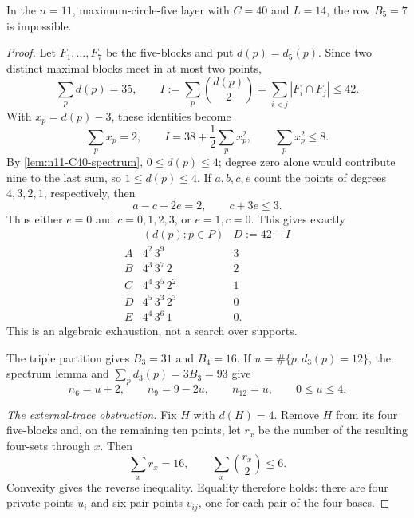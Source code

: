 \begin{lemma}\label{lem:n11-seven-five}
In the \(n=11\), maximum-circle-five layer with \(C=40\) and \(L=14\),
the row \(B_5=7\) is impossible.
\end{lemma}

\begin{proof}
Let \(F_1,\ldots,F_7\) be the five-blocks and put \(d(p)=d_5(p)\).  Since
two distinct maximal blocks meet in at most two points,
\[
 \sum_p d(p)=35,\qquad
 I:=\sum_p\binom{d(p)}2
   =\sum_{i<j}|F_i\cap F_j|\le42.
\]
With \(x_p=d(p)-3\), these identities become
\begin{equation}\label{eq:seven5-moment}
 \sum_p x_p=2,\qquad I=38+\frac12\sum_p x_p^2,
 \qquad \sum_p x_p^2\le8.
\end{equation}
By \cref{lem:n11-C40-spectrum}, \(0\le d(p)\le4\); degree zero alone would
contribute nine to the last sum, so \(1\le d(p)\le4\).  If \(a,b,c,e\)
count the points of degrees \(4,3,2,1\), respectively, then
\[
 a-c-2e=2,\qquad c+3e\le3.
\]
Thus either \(e=0\) and \(c=0,1,2,3\), or \(e=1,c=0\).  This gives exactly
\begin{equation}\label{eq:seven5-profiles-lemma}
\begin{array}{c|c|c}
 & (d(p):p\in P)&D:=42-I\\ \hline
A&4^2\,3^9&3\\
B&4^3\,3^7\,2&2\\
C&4^4\,3^5\,2^2&1\\
D&4^5\,3^3\,2^3&0\\
E&4^4\,3^6\,1&0.
\end{array}
\end{equation}
This is an algebraic exhaustion, not a search over supports.

The triple partition gives \(B_3=31\) and \(B_4=16\).  If
\(u=\#\{p:d_3(p)=12\}\), the spectrum lemma and
\(\sum_p d_3(p)=3B_3=93\) give
\begin{equation}\label{eq:seven5-d3-counts}
 n_6=u+2,\qquad n_9=9-2u,\qquad n_{12}=u,\qquad0\le u\le4.
\end{equation}

\smallskip
\noindent\emph{The external-trace obstruction.}
Fix \(H\) with \(d(H)=4\).  Remove \(H\) from its four five-blocks and,
on the remaining ten points, let \(r_x\) be the number of the resulting
four-sets through \(x\).  Then
\[
 \sum_xr_x=16,\qquad \sum_x\binom{r_x}{2}\le6.
\]
Convexity gives the reverse inequality.  Equality therefore holds: there
are four private points \(u_i\) and six pair-points \(v_{ij}\), one for
each pair of the four bases.


\end{proof}
